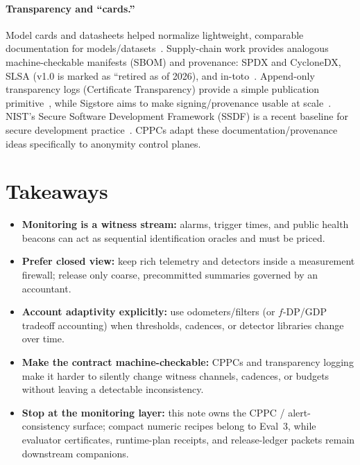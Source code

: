 \documentclass[11pt]{article}
\begin{document}
\paragraph{Transparency and ``cards.''}
Model cards and datasheets helped normalize lightweight, comparable documentation for models/datasets~\cite{mitchell2019modelcards,gebru2021datasheets}.
Supply-chain work provides analogous machine-checkable manifests (SBOM) and provenance: SPDX and CycloneDX, SLSA (v1.0 is marked as ``retired as of 2026), and in-toto~\cite{spdx_spec301,slsa_spec_v10,in_toto2019}.
Append-only transparency logs (Certificate Transparency) provide a simple publication primitive~\cite{rfc9162_ct}, while Sigstore aims to make signing/provenance usable at scale~\cite{newman2022sigstore}.
NIST's Secure Software Development Framework (SSDF) is a recent baseline for secure development practice~\cite{nist_ssdf_800_218}.
CPPCs adapt these documentation/provenance ideas specifically to anonymity control planes.




\section{Takeaways}
\begin{itemize}[leftmargin=*]
\item \textbf{Monitoring is a witness stream:} alarms, trigger times, and public health beacons can act as sequential identification oracles and must be priced.
\item \textbf{Prefer closed view:} keep rich telemetry and detectors inside a measurement firewall; release only coarse, precommitted summaries governed by an accountant.
\item \textbf{Account adaptivity explicitly:} use odometers/filters (or $f$-DP/GDP tradeoff accounting) when thresholds, cadences, or detector libraries change over time.
\item \textbf{Make the contract machine-checkable:} CPPCs and transparency logging make it harder to silently change witness channels, cadences, or budgets without leaving a detectable inconsistency.
\item \textbf{Stop at the monitoring layer:} this note owns the CPPC / alert-consistency surface; compact numeric recipes belong to Eval~3, while evaluator certificates, runtime-plan receipts, and release-ledger packets remain downstream companions.\cite{series:eval3,series:evalnotary,series:opB,series:release}
\end{itemize}
\end{document}
